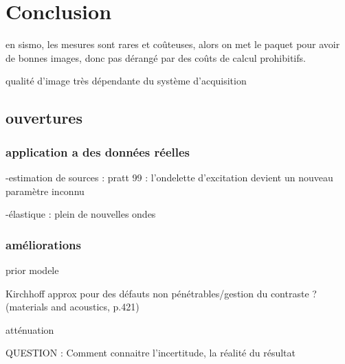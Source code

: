 \chapter{Conclusion}

en sismo, les mesures sont rares et coûteuses, alors on met le paquet pour avoir de bonnes images, donc pas dérangé par des coûts de calcul prohibitifs.

qualité d'image très dépendante du système d'acquisition

\section{ouvertures}

\subsection{application a des données réelles}
-estimation de sources : pratt 99 : l'ondelette d'excitation devient un nouveau paramètre inconnu 

-élastique : plein de nouvelles ondes 


\subsection{améliorations}
prior modele

Kirchhoff approx pour des défauts non pénétrables/gestion du contraste ? (materials and acoustics, p.421)

atténuation

QUESTION : 
Comment connaitre l'incertitude, la réalité du résultat
